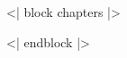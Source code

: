 <| block chapters |>
\newcommand{\cinput}[1]{}
\cinput{01.tex}       %
\cinput{02.tex}       %
\cinput{03.tex}       %
\cinput{04.tex}       %
\cinput{05.tex}       %
\cinput{06.tex}       %
\cinput{07.tex}       %
\cinput{changes.tex}
<| endblock |>

